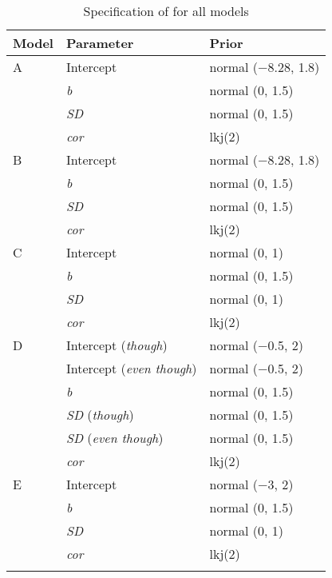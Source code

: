 \begin{table}
\caption{Specification of  for all models\label{tab:B.2}}
\begin{tabular}{lll}
\lsptoprule
Model & Parameter                & Prior               \\\midrule
A     & Intercept                & normal (−8.28, 1.8) \\
      & \textit{b}                        & normal (0, 1.5)     \\
      & \textit{SD}                       & normal (0, 1.5)     \\
      & \textit{cor}                      & lkj(2)              \\\addlinespace
B     & Intercept                & normal (−8.28, 1.8) \\
      & \textit{b}                        & normal (0, 1.5)     \\
      & \textit{SD}                       & normal (0, 1.5)     \\
      & \textit{cor}                      & lkj(2)              \\\addlinespace
C     & Intercept                & normal (0, 1)       \\
      & \textit{b}                        & normal (0, 1.5)     \\
      & \textit{SD}                       & normal (0, 1)       \\
      & \textit{cor}                     & lkj(2)              \\\addlinespace
D     & Intercept (\textit{though})       & normal (−0.5, 2)    \\
      & Intercept (\textit{even though})  & normal (−0.5, 2)    \\
      & \textit{b}                        & normal (0, 1.5)     \\
      & \textit{SD} (\textit{though})              & normal (0, 1.5)     \\
      & \textit{SD} (\textit{even though})         & normal (0, 1.5)     \\
      & \textit{cor}                      & lkj(2)              \\\addlinespace
E     & Intercept                & normal (−3, 2)      \\
      & \textit{b}                        & normal (0, 1.5)     \\
      & \textit{SD}                       & normal (0, 1)       \\
      & \textit{cor}                      & lkj(2)              \\
\lspbottomrule
\end{tabular}
\end{table}
